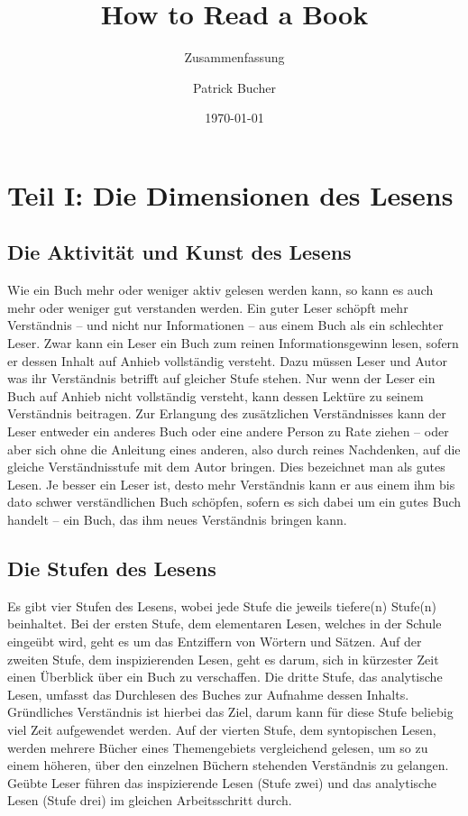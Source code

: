 \documentclass[a4paper,12pt]{scrartcl}
\begin{document}
\title{How to Read a Book\\\cite{adler-vandooren}}
\subtitle{Zusammenfassung}
\author{Patrick Bucher}
\date{\today}
\maketitle

\tableofcontents

\newpage
\section*{Teil I: Die Dimensionen des Lesens}

\subsection{Die Aktivität und Kunst des Lesens}

Wie ein Buch mehr oder weniger aktiv gelesen werden kann, so kann es auch mehr oder weniger gut verstanden werden. Ein guter Leser schöpft mehr Verständnis – und nicht nur Informationen – aus einem Buch als ein schlechter Leser. Zwar kann ein Leser ein Buch zum reinen Informationsgewinn lesen, sofern er dessen Inhalt auf Anhieb vollständig versteht. Dazu müssen Leser und Autor was ihr Verständnis betrifft auf gleicher Stufe stehen. Nur wenn der Leser ein Buch auf Anhieb nicht vollständig versteht, kann dessen Lektüre zu seinem Verständnis beitragen. Zur Erlangung des zusätzlichen Verständnisses kann der Leser entweder ein anderes Buch oder eine andere Person zu Rate ziehen – oder aber sich ohne die Anleitung eines anderen, also durch reines Nachdenken, auf die gleiche Verständnisstufe mit dem Autor bringen. Dies bezeichnet man als gutes Lesen. Je besser ein Leser ist, desto mehr Verständnis kann er aus einem ihm bis dato schwer verständlichen Buch schöpfen, sofern es sich dabei um ein gutes Buch handelt – ein Buch, das ihm neues Verständnis bringen kann.

\subsection{Die Stufen des Lesens}

Es gibt vier Stufen des Lesens, wobei jede Stufe die jeweils tiefere(n) Stufe(n) beinhaltet. Bei der ersten Stufe, dem elementaren Lesen, welches in der Schule eingeübt wird, geht es um das Entziffern von Wörtern und Sätzen. Auf der zweiten Stufe, dem inspizierenden Lesen, geht es darum, sich in kürzester Zeit einen Überblick über ein Buch zu verschaffen. Die dritte Stufe, das analytische Lesen, umfasst das Durchlesen des Buches zur Aufnahme dessen Inhalts. Gründliches Verständnis ist hierbei das Ziel, darum kann für diese Stufe beliebig viel Zeit aufgewendet werden. Auf der vierten Stufe, dem syntopischen Lesen, werden mehrere Bücher eines Themengebiets vergleichend gelesen, um so zu einem höheren, über den einzelnen Büchern stehenden Verständnis zu gelangen. Geübte Leser führen das inspizierende Lesen (Stufe zwei) und das analytische Lesen (Stufe drei) im gleichen Arbeitsschritt durch.
\end{document}

